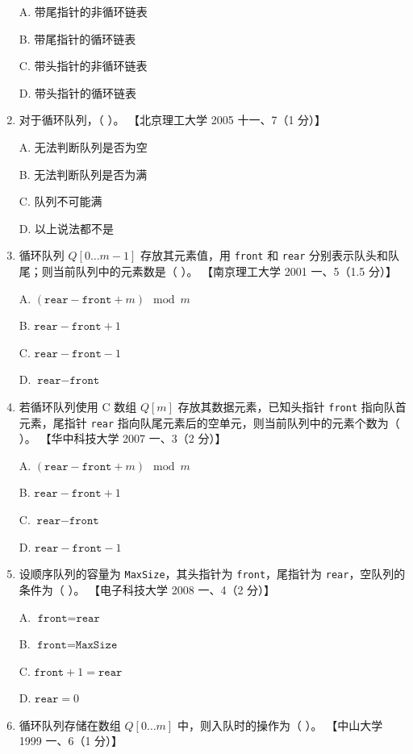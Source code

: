 \documentclass[lang=cn,newtx,10pt,scheme=chinese]{../../elegantbook}
\begin{document}
\begin{enumerate}
    A. 带尾指针的非循环链表  

    B. 带尾指针的循环链表  

    C. 带头指针的非循环链表  

    D. 带头指针的循环链表  

    \item 对于循环队列，（ ）。  
    【北京理工大学 2005 十一、7（1 分）】  

    A. 无法判断队列是否为空  

    B. 无法判断队列是否为满  

    C. 队列不可能满  

    D. 以上说法都不是  

    \item 循环队列 $Q[0 \ldots m-1]$ 存放其元素值，用 \texttt{front} 和 \texttt{rear} 分别表示队头和队尾；则当前队列中的元素数是（ ）。  
    【南京理工大学 2001 一、5（1.5 分）】  

    A. $(\texttt{rear} - \texttt{front} + m) \mod m$  

    B. $\texttt{rear} - \texttt{front} + 1$  

    C. $\texttt{rear} - \texttt{front} - 1$  

    D. $\texttt{rear} - \texttt{front}$  

    \item 若循环队列使用 C 数组 $Q[m]$ 存放其数据元素，已知头指针 \texttt{front} 指向队首元素，尾指针 \texttt{rear} 指向队尾元素后的空单元，则当前队列中的元素个数为（ ）。  
    【华中科技大学 2007 一、3（2 分）】 

    A. $(\texttt{rear} - \texttt{front} + m) \mod m$  

    B. $\texttt{rear} - \texttt{front} + 1$  

    C. $\texttt{rear} - \texttt{front}$  

    D. $\texttt{rear} - \texttt{front} - 1$  

    \item 设顺序队列的容量为 \texttt{MaxSize}，其头指针为 \texttt{front}，尾指针为 \texttt{rear}，空队列的条件为（ ）。  
    【电子科技大学 2008 一、4（2 分）】  

    A. $\texttt{front} = \texttt{rear}$  

    B. $\texttt{front} = \texttt{MaxSize}$  

    C. $\texttt{front} + 1 = \texttt{rear}$  

    D. $\texttt{rear} = 0$  

    \item 循环队列存储在数组 $Q[0 \ldots m]$ 中，则入队时的操作为（ ）。  
    【中山大学 1999 一、6（1 分）】  


\end{enumerate}
\end{document}
